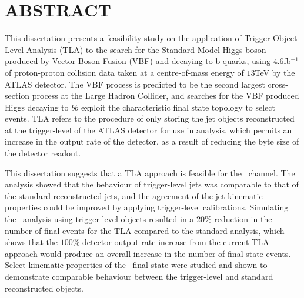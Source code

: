 \chapter*{ABSTRACT}


This dissertation presents a feasibility study on the application of Trigger-Object Level Analysis (TLA) to the search for the Standard Model Higgs boson produced by Vector Boson Fusion (VBF) and decaying to b-quarks, using $4.6$fb$^{-1}$ of proton-proton collision data taken at a centre-of-mass energy of $13$TeV by the ATLAS detector. The VBF process is predicted to be the second largest cross-section process at the Large Hadron Collider, and searches for the VBF produced Higgs decaying to $b\bar{b}$ exploit the characteristic final state topology to select events. TLA refers to the procedure of only storing the jet objects reconstructed at the trigger-level of the ATLAS detector for use in analysis, which permits an increase in the output rate of the detector, as a result of reducing the byte size of the detector readout.

This dissertation suggests that a TLA approach is feasible for the \VBFHBB\ channel. The analysis showed that the behaviour of trigger-level jets was comparable to that of the standard reconstructed jets, and the agreement of the jet kinematic properties could be improved by applying trigger-level calibrations. Simulating the \VBFHBB\ analysis using trigger-level objects resulted in a $20\%$ reduction in the number of final events for the TLA compared to the standard analysis, which shows that the $100\%$ detector output rate increase from the current TLA approach would produce an overall increase in the number of final state events. Select kinematic properties of the \VBFHBB\ final state were studied and shown to demonstrate comparable behaviour between the trigger-level and standard reconstructed objects.

\cleardoublepage

\endinput
